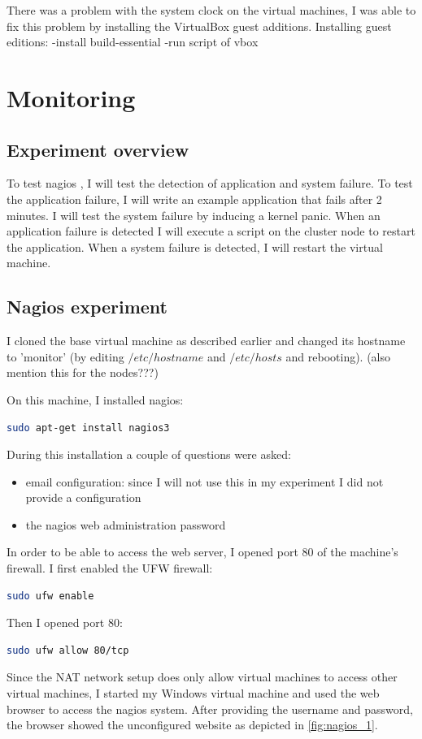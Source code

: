 \documentclass[12pt]{report}
\begin{document}
There was a problem with the system clock on the virtual machines, 
I was able to fix this problem by installing the VirtualBox guest
additions.
Installing guest editions:
-install build-essential
-run script of vbox

\section{Monitoring}
\subsection{Experiment overview}
To test nagios \cite{nagios:2013}, I will test the detection of
application and system failure. To test the application failure, I
will write an example application that fails after
2 minutes. I will test the system failure by inducing a kernel panic.
When an application failure is detected I will execute a script on the
cluster node to restart the application.
When a system failure is detected, I will restart the virtual
machine. 

\subsection{Nagios experiment}
I cloned the base virtual machine as described earlier and changed its
hostname to 'monitor' (by editing $/etc/hostname$ and $/etc/hosts$ and
rebooting). (also mention this for the nodes???)


On this machine, I installed nagios:
\begin{lstlisting}[language=bash]
 sudo apt-get install nagios3
\end{lstlisting}
During this installation a couple of questions were asked:
\begin{itemize}
\item email configuration: since I will not use this in my experiment
  I did not provide a configuration 
\item the nagios web administration password
\end{itemize}
In order to be able to access the web server, I opened port 80 of the
machine's firewall. 
I first enabled the UFW firewall:
\begin{lstlisting}[language=bash]
  sudo ufw enable
\end{lstlisting} 
Then I opened port 80:
\begin{lstlisting}[language=bash]
  sudo ufw allow 80/tcp
\end{lstlisting} 
Since the NAT network setup does only allow virtual machines to access
other virtual machines, I started my Windows virtual machine and used
the web browser to access the nagios system. After providing the
username and password, the browser showed the unconfigured website as
depicted in \cref{fig:nagios_1}.
\end{document}

